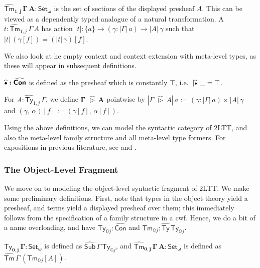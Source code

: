 \documentclass[acmsmall,screen]{acmart}
\newcommand{\msf}[1]{\mathsf{#1}}
\newcommand{\mbb}[1]{\mathbb{#1}}
\newcommand{\bs}[1]{\boldsymbol{#1}}
\newcommand{\wh}[1]{\widehat{#1}}
\newcommand{\ext}{\triangleright}
\newcommand{\mbbo}{\mbb{O}}
\newcommand{\Ty}{\msf{Ty}}
\newcommand{\Tm}{\msf{Tm}}
\newcommand{\hCon}{\wh{\msf{Con}}}
\newcommand{\hSub}{\wh{\msf{Sub}}}
\newcommand{\hTy}{\wh{\msf{Ty}}}
\newcommand{\hTm}{\wh{\msf{Tm}}}
\newcommand{\emptycon}{\scaleobj{.75}\bullet}
\newcommand{\Set}{\mathsf{Set}}
\theoremstyle{remark}
\begin{document}
\begin{definition}
  $\bs{\hTm_{1,j}\,\Gamma\,A : \Set_\omega}$ is the set of sections of the
  displayed presheaf $A$. This can be viewed as a dependently typed analogue of
  a natural transformation.  A $t : \hTm_{1,j}\,\Gamma\,A$ has action $|t| :
  \{a\} \to (\gamma : |\Gamma|\,a) \to |A|\,\gamma$ such that $|t|\,(\gamma[f])
  = (|t|\,\gamma)[f]$.
\end{definition}

We also look at he empty context and context extension with meta-level types,
as these will appear in subsequent definitions.

\begin{definition}\label{def:psh-emptycon}
$\bs{{\widehat{\emptycon}} : \hCon}$ is defined as the presheaf
which is constantly $\top$, i.e.\ $|\wh{\emptycon}|\,\_ = \top$.
\end{definition}

\begin{definition}\label{def:psh-ext} For $A : \hTy_{1,j}\,\Gamma$, we define $\bs{\Gamma\,\,\wh{\ext}\,A}$
pointwise by $|\Gamma\,\,\wh{\ext}\,A|\,a := (\gamma : |\Gamma|\,a) \times |A|\,\gamma$
and $(\gamma,\,\alpha)[f] := (\gamma[f],\,\alpha[f])$.
\end{definition}

Using the above definitions, we can model the syntactic category of 2LTT, and
also the meta-level family structure and all meta-level type formers. For
expositions in previous literature, see \cite[Chapter~1.2]{huber-thesis} and
\cite[Section~4.1]{Hofmann97syntaxand}.

\subsubsection{The Object-Level Fragment}

We move on to modeling the object-level syntactic fragment of 2LTT. We make some
preliminary definitions. First, note that types in the object theory yield a
presheaf, and terms yield a displayed presheaf over them; this immediately
follows from the specification of a family structure in a cwf. Hence, we do a
bit of a name overloading, and have $\Ty_{\mbbo j} : \hCon$ and $\Tm_{\mbbo j} : \hTy\,\Ty_{\mbbo j}$.

\begin{definition}
$\bs{\hTy_{0,j}\,\Gamma : \Set_\omega}$ is defined as $\hSub\,\Gamma\,\Ty_{\mbbo j}$,
and $\bs{\hTm_{0,j}\,\Gamma\,A : \Set_\omega}$ is defined as $\hTm\,\Gamma\,(\Tm_{\mbbo j}[A])$.
\end{definition}
\end{document}
